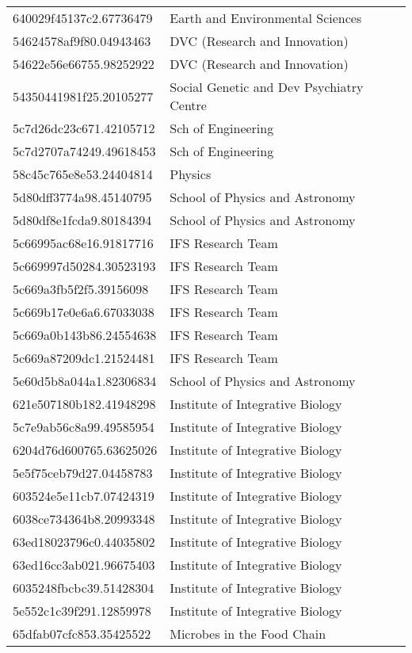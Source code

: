 \begin{tabular}{ll}
640029f45137c2.67736479 & Earth and Environmental Sciences \\
54624578af9f80.04943463 & DVC (Research and Innovation) \\
54622e56e66755.98252922 & DVC (Research and Innovation) \\
54350441981f25.20105277 & Social Genetic and Dev Psychiatry Centre \\
5c7d26dc23c671.42105712 & Sch of Engineering \\
5c7d2707a74249.49618453 & Sch of Engineering \\
58c45c765e8e53.24404814 & Physics \\
5d80dff3774a98.45140795 & School of Physics and Astronomy \\
5d80df8e1fcda9.80184394 & School of Physics and Astronomy \\
5c66995ac68e16.91817716 & IFS Research Team \\
5c669997d50284.30523193 & IFS Research Team \\
5c669a3fb5f2f5.39156098 & IFS Research Team \\
5c669b17e0e6a6.67033038 & IFS Research Team \\
5c669a0b143b86.24554638 & IFS Research Team \\
5c669a87209dc1.21524481 & IFS Research Team \\
5e60d5b8a044a1.82306834 & School of Physics and Astronomy \\
621e507180b182.41948298 & Institute of Integrative Biology \\
5c7e9ab56c8a99.49585954 & Institute of Integrative Biology \\
6204d76d600765.63625026 & Institute of Integrative Biology \\
5e5f75ceb79d27.04458783 & Institute of Integrative Biology \\
603524e5e11cb7.07424319 & Institute of Integrative Biology \\
6038ce734364b8.20993348 & Institute of Integrative Biology \\
63ed18023796c0.44035802 & Institute of Integrative Biology \\
63ed16cc3ab021.96675403 & Institute of Integrative Biology \\
6035248fbcbc39.51428304 & Institute of Integrative Biology \\
5e552c1c39f291.12859978 & Institute of Integrative Biology \\
65dfab07cfc853.35425522 & Microbes in the Food Chain \\

\end{tabular}
